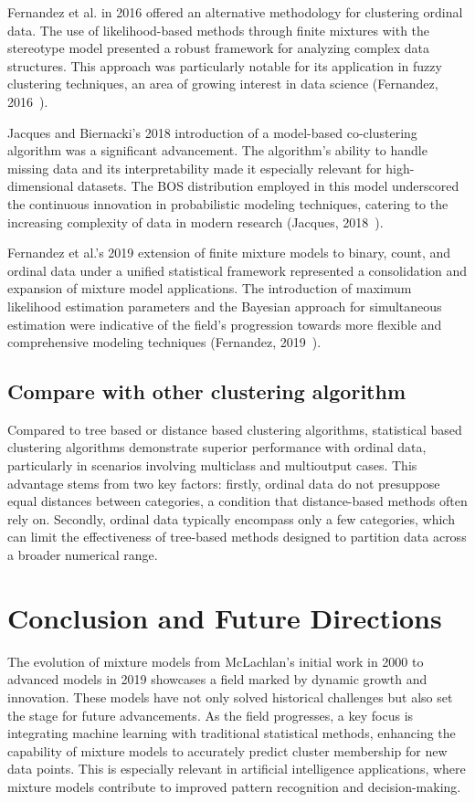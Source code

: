 \documentclass{article}
\begin{document}
Fernandez et al. in 2016 offered an alternative methodology for clustering ordinal data. The use of likelihood-based methods through finite mixtures with the stereotype model presented a robust framework for analyzing complex data structures. This approach was particularly notable for its application in fuzzy clustering techniques, an area of growing interest in data science (Fernandez, 2016~\cite{fernandez2016mixture}).

Jacques and Biernacki's 2018 introduction of a model-based co-clustering algorithm was a significant advancement. The algorithm's ability to handle missing data and its interpretability made it especially relevant for high-dimensional datasets. The BOS distribution employed in this model underscored the continuous innovation in probabilistic modeling techniques, catering to the increasing complexity of data in modern research (Jacques, 2018~\cite{jacques2018model}).

Fernandez et al.'s 2019 extension of finite mixture models to binary, count, and ordinal data under a unified statistical framework represented a consolidation and expansion of mixture model applications. The introduction of maximum likelihood estimation parameters and the Bayesian approach for simultaneous estimation were indicative of the field's progression towards more flexible and comprehensive modeling techniques (Fernandez, 2019~\cite{fernandez2019finite}).

\subsection*{Compare with other clustering algorithm}

Compared to tree based or distance based clustering algorithms, statistical based clustering algorithms demonstrate superior performance with ordinal data, particularly in scenarios involving multiclass and multioutput cases. 
This advantage stems from two key factors: firstly, ordinal data do not presuppose equal distances between categories, a condition that distance-based methods often rely on. Secondly, ordinal data typically encompass only a few categories, which can limit the effectiveness of tree-based methods designed to partition data across a broader numerical range.
\section{Conclusion and Future Directions}

The evolution of mixture models from McLachlan's initial work in 2000 to advanced models in 2019 showcases a field marked by dynamic growth and innovation. These models have not only solved historical challenges but also set the stage for future advancements. As the field progresses, a key focus is integrating machine learning with traditional statistical methods, enhancing the capability of mixture models to accurately predict cluster membership for new data points. This is especially relevant in artificial intelligence applications, where mixture models contribute to improved pattern recognition and decision-making.
\end{document}

